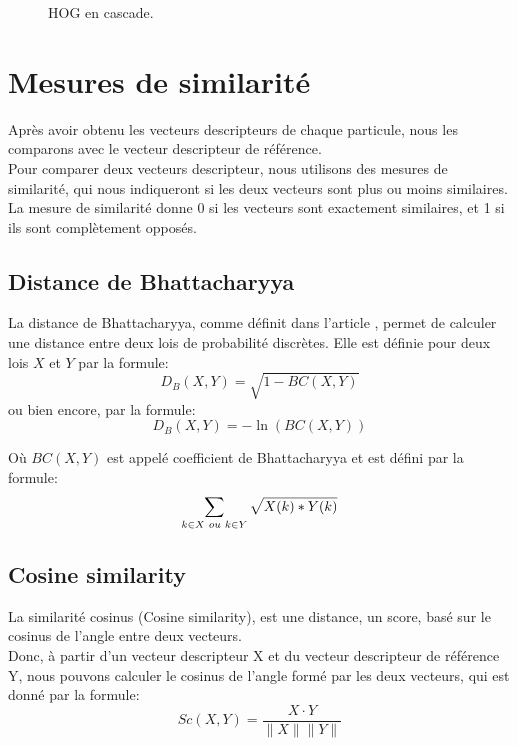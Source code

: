 \begin{figure}[!htbp]
\center
\caption{HOG en cascade.}
\label{fig:cuttlefish_hog}
\end{figure}
\FloatBarrier




\section{Mesures de similarité}
Après avoir obtenu les vecteurs descripteurs de chaque particule, nous les comparons avec le vecteur descripteur de référence.\\
Pour comparer deux vecteurs descripteur, nous utilisons des mesures de similarité, qui nous indiqueront si les deux vecteurs sont plus ou moins similaires. La mesure de similarité donne 0 si les vecteurs sont exactement similaires, et 1 si ils sont complètement opposés.

\subsection{Distance de Bhattacharyya}
La distance de Bhattacharyya, comme définit dans l'article \cite{bhattacharyya_measure_1960}, permet de calculer une distance entre deux lois de probabilité discrètes. Elle est définie pour deux lois $X$ et $Y$ par la formule:
$$D_{B}(X, Y) = \sqrt{1 - BC(X, Y)}$$
ou bien encore, par la formule:
$$D_{B}(X, Y) = -\ln(BC(X, Y))$$

Où $BC(X, Y)$ est appelé coefficient de Bhattacharyya et est défini par la formule:
$$\sum_{k \in X \hspace{0.1cm} ou \hspace{0.1cm} k \in Y} \sqrt{X(k)*Y(k)}$$


\subsection{Cosine similarity}
La similarité cosinus (Cosine similarity), est une distance, un score, basé sur le cosinus de l'angle entre deux vecteurs.\\
Donc, à partir d'un vecteur descripteur X et du vecteur descripteur de référence Y, nous pouvons calculer le cosinus de l'angle formé par les deux vecteurs, qui est donné par la formule:
$$Sc(X, Y) = \frac{X \cdot Y}{\|X\|\|Y\|}$$\\


